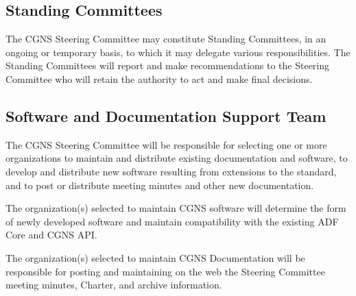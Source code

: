 \subsection{Standing Committees}
\label{s:committees}

The CGNS Steering Committee may constitute Standing Committees, in
an ongoing or temporary basis, to which it may delegate various
responsibilities.
The Standing Committees will report and make recommendations to the
Steering Committee who will retain the authority to act and make final
decisions.

\subsection{Software and Documentation Support Team}
\label{s:supportteam}

The CGNS Steering Committee will be responsible for selecting one or
more organizations to maintain and distribute existing documentation
and software, to develop and distribute new software resulting from
extensions to the standard, and to post or distribute meeting minutes
and other new documentation.

The organization(s) selected to maintain CGNS software will determine
the form of newly developed software and maintain compatibility with the
existing ADF Core and CGNS API.

The organization(s) selected to maintain CGNS Documentation will
be responsible for posting and maintaining on the web the Steering
Committee meeting minutes, Charter, and archive information.
